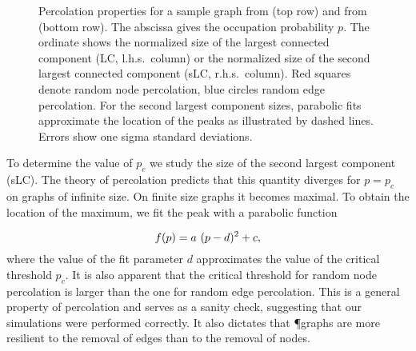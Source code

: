 		\begin{figure}
			\centering
			\qquad
			\newline
			\qquad

			
			\caption[Percolation properties]{Percolation properties for a sample graph from  (top row) and from  (bottom row). The abscissa gives the occupation probability $p$. The ordinate shows the normalized size of the largest connected component (LC, l.h.s.\ column) or the normalized size of the second largest connected component (sLC, r.h.s.\ column). Red squares denote random node percolation, blue circles random edge percolation. For the second largest component sizes, parabolic fits approximate the location of the peaks as illustrated by dashed lines. Errors show one sigma standard deviations.}
			\label{fig:percolation_observables}
		\end{figure}

		
		To determine the value of $p_c$ we study the size of the second largest component (sLC). The theory of percolation predicts that this quantity diverges for $p=p_c$ on graphs of infinite size. On finite size graphs it becomes maximal. To obtain the location of the maximum, we fit the peak with a parabolic function

		\begin{equation}
			f(p) = a \ (p-d)^2 + c,\notag
		\end{equation}
		where the value of the fit parameter $d$ approximates the value of the critical threshold $p_c$. It is also apparent that the critical threshold for random node percolation is larger than the one for random edge percolation. This is a general property of percolation and serves as a sanity check, suggesting that our simulations were performed correctly. It also dictates that \P graphs are more resilient to the removal of edges than to the removal of nodes.

